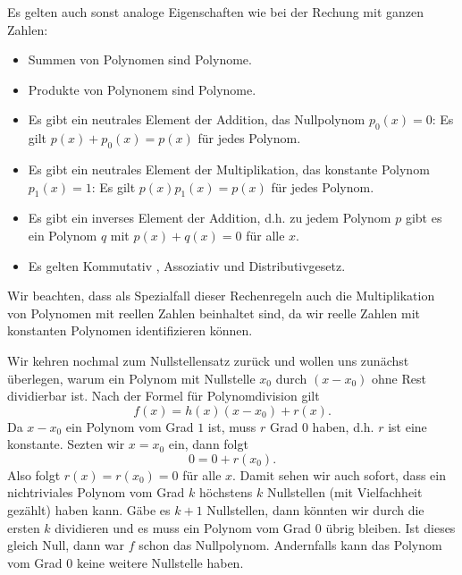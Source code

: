 \documentclass[letterpaper,10pt,english]{jupyterBook}
\begin{document}
Es gelten auch sonst analoge Eigenschaften wie bei der Rechung mit ganzen Zahlen:
\begin{itemize}
\item {} 
Summen von Polynomen sind Polynome.

\item {} 
Produkte von Polynonem sind Polynome.

\item {} 
Es gibt ein neutrales Element der Addition, das Nullpolynom \(p_0(x)=0\): Es gilt \(p(x) + p_0(x) = p(x)\) für jedes Polynom.

\item {} 
Es gibt ein neutrales Element der Multiplikation, das konstante Polynom \(p_1(x)=1\): Es gilt \(p(x) p_1(x) = p(x)\) für jedes Polynom.

\item {} 
Es gibt ein inverses Element der Addition, d.h. zu jedem Polynom \(p\) gibt es ein Polynom \(q\) mit \(p(x) + q(x) =0\) für alle \(x\).

\item {} 
Es gelten Kommutativ , Assoziativ  und Distributivgesetz.

\end{itemize}

Wir beachten, dass als Spezialfall dieser Rechenregeln auch die Multiplikation von Polynomen mit reellen Zahlen beinhaltet sind, da wir reelle Zahlen mit konstanten Polynomen identifizieren können.

Wir kehren nochmal zum Nullstellensatz zurück und wollen uns zunächst überlegen, warum ein Polynom mit Nullstelle \(x_0\) durch \((x-x_0)\) ohne Rest dividierbar ist. Nach der Formel für Polynomdivision gilt
\begin{equation*}
 f(x) = h(x) (x-x_0) + r(x).
\end{equation*}
Da \(x-x_0\) ein Polynom vom Grad \(1\) ist, muss \(r\) Grad \(0\) haben, d.h. \(r\) ist eine konstante. Sezten wir \(x=x_0\) ein, dann folgt
\begin{equation*}
 0 = 0 + r(x_0) .\end{equation*}
Also folgt \(r(x) =r(x_0) = 0\) für alle \(x\). Damit sehen wir auch sofort, dass ein nichtriviales Polynom vom Grad \(k\) höchstens \(k\) Nullstellen (mit Vielfachheit gezählt) haben kann. Gäbe es \(k+1\) Nullstellen, dann könnten wir durch die ersten \(k\) dividieren und es muss ein Polynom vom Grad \(0\) übrig bleiben. Ist dieses gleich Null, dann war \(f\) schon das Nullpolynom. Andernfalls kann das Polynom vom Grad \(0\) keine weitere Nullstelle haben.
\end{document}
